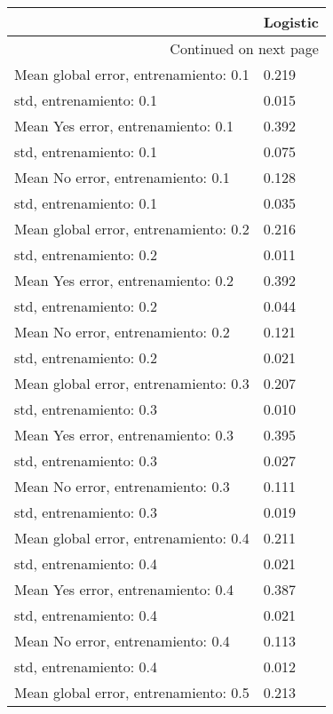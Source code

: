 \begin{longtable}{p{4cm}|p{1.5cm}}
\toprule
{} &  Logistic \\
\midrule
\endhead
\midrule
\multicolumn{2}{r}{{Continued on next page}} \\
\midrule
\endfoot

\bottomrule
\endlastfoot
Mean global error, entrenamiento: 0.1 &     0.219 \\
std, entrenamiento: 0.1               &     0.015 \\
Mean Yes error, entrenamiento: 0.1    &     0.392 \\
std, entrenamiento: 0.1               &     0.075 \\
Mean No error, entrenamiento: 0.1     &     0.128 \\
std, entrenamiento: 0.1               &     0.035 \\
Mean global error, entrenamiento: 0.2 &     0.216 \\
std, entrenamiento: 0.2               &     0.011 \\
Mean Yes error, entrenamiento: 0.2    &     0.392 \\
std, entrenamiento: 0.2               &     0.044 \\
Mean No error, entrenamiento: 0.2     &     0.121 \\
std, entrenamiento: 0.2               &     0.021 \\
Mean global error, entrenamiento: 0.3 &     0.207 \\
std, entrenamiento: 0.3               &     0.010 \\
Mean Yes error, entrenamiento: 0.3    &     0.395 \\
std, entrenamiento: 0.3               &     0.027 \\
Mean No error, entrenamiento: 0.3     &     0.111 \\
std, entrenamiento: 0.3               &     0.019 \\
Mean global error, entrenamiento: 0.4 &     0.211 \\
std, entrenamiento: 0.4               &     0.021 \\
Mean Yes error, entrenamiento: 0.4    &     0.387 \\
std, entrenamiento: 0.4               &     0.021 \\
Mean No error, entrenamiento: 0.4     &     0.113 \\
std, entrenamiento: 0.4               &     0.012 \\
Mean global error, entrenamiento: 0.5 &     0.213 \\

\end{longtable}
